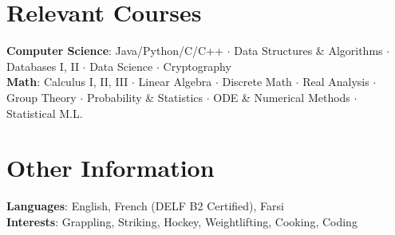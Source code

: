 \documentclass[letterpaper,10pt]{article}
\begin{document}
\section{Relevant Courses}
 \begin{itemize}[leftmargin=0.15in, label={}]
    \small{\item{
     \textbf{Computer Science}{: Java/Python/C/C++ $\cdot$ Data Structures \& Algorithms $\cdot$ Databases I, II $\cdot$ Data Science $\cdot$ Cryptography} \\
     \textbf{Math}{: Calculus I, II, III $\cdot$ Linear Algebra $\cdot$ Discrete Math $\cdot$ Real Analysis $\cdot$ Group Theory $\cdot$ Probability \& Statistics $\cdot$ ODE \& Numerical Methods $\cdot$ Statistical M.L.} \\
    }}
 \end{itemize}



\section{Other Information}
 \begin{itemize}[leftmargin=0.15in, label={}]
    \small{\item{
     \textbf{Languages}{: English, French (DELF B2 Certified), Farsi} \\
     \textbf{Interests}{: Grappling, Striking, Hockey, Weightlifting, Cooking, Coding}
    }}
 \end{itemize}





 
\end{document}
